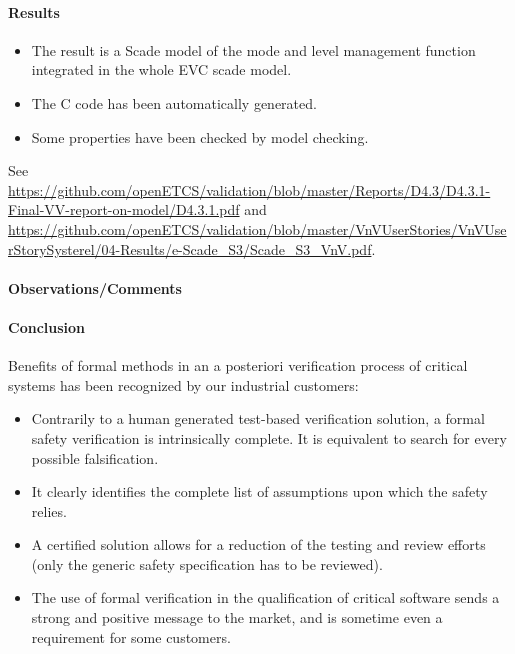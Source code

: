 \paragraph{Results}


\begin{itemize}
\item The result is a Scade model of the mode and level management function integrated in the whole EVC scade model.
\item The C code has been automatically  generated.
\item Some properties have been checked by model checking.
\end{itemize}

See {\url{https://github.com/openETCS/validation/blob/master/Reports/D4.3/D4.3.1-Final-VV-report-on-model/D4.3.1.pdf}} and {\url{https://github.com/openETCS/validation/blob/master/VnVUserStories/VnVUserStorySysterel/04-Results/e-Scade_S3/Scade_S3_VnV.pdf}}.



\paragraph{Observations/Comments}


\paragraph{Conclusion}



Benefits of formal  methods in an a posteriori verification process of critical systems has been recognized by our industrial customers:

\begin{itemize}
\item Contrarily to a human generated test-based verification solution, a formal safety verification is
intrinsically complete. It is equivalent to search for every possible falsification.
\item It clearly identifies the complete list of assumptions upon which the safety relies.
\item A certified solution allows for a reduction of the testing and review efforts (only the generic safety
specification has to be reviewed).
\item The use of formal verification in the qualification of critical software sends a strong
and positive message to the market, and is sometime even a requirement for some customers.
\end{itemize}

